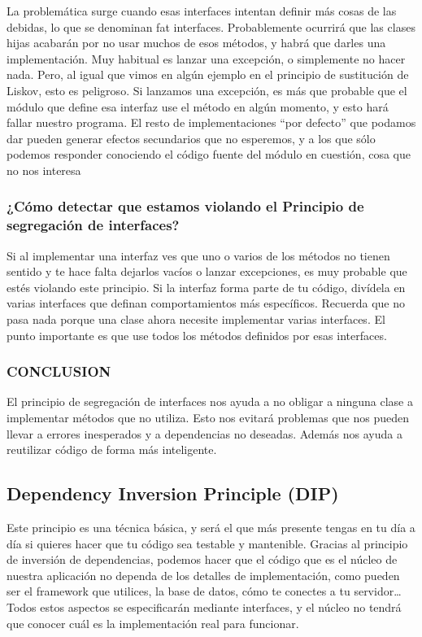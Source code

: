 \documentclass[12pt,letterpaper]{article}
\begin{document}
La problemática surge cuando esas interfaces intentan definir más cosas de las
debidas, lo que se denominan fat interfaces. Probablemente ocurrirá que las clases
hijas acabarán por no usar muchos de esos métodos, y habrá que darles una
implementación. Muy habitual es lanzar una excepción, o simplemente no hacer
nada.
Pero, al igual que vimos en algún ejemplo en el principio de sustitución de Liskov,
esto es peligroso. Si lanzamos una excepción, es más que probable que el módulo
que define esa interfaz use el método en algún momento, y esto hará fallar nuestro
programa. El resto de implementaciones “por defecto” que podamos dar pueden
generar efectos secundarios que no esperemos, y a los que sólo podemos responder
conociendo el código fuente del módulo en cuestión, cosa que no nos interesa

\subsubsection{¿Cómo detectar que estamos violando el
Principio de segregación de interfaces?}

Si al implementar una interfaz ves que
uno o varios de los métodos no tienen sentido y te hace falta dejarlos vacíos o
lanzar excepciones, es muy probable que estés violando este principio. Si la interfaz
forma parte de tu código, divídela en varias interfaces que definan comportamientos
más específicos.
Recuerda que no pasa nada porque una clase ahora necesite implementar varias
interfaces. El punto importante es que use todos los métodos definidos por esas
interfaces.

\subsubsection{CONCLUSION}

El principio de segregación de interfaces nos ayuda a no obligar a ninguna clase a
implementar métodos que no utiliza. Esto nos evitará problemas que nos pueden
llevar a errores inesperados y a dependencias no deseadas. Además nos ayuda a
reutilizar código de forma más inteligente.

\subsection{ Dependency Inversion Principle (DIP)}



Este principio es una técnica básica, y será el que más presente tengas en tu día a
día si quieres hacer que tu código sea testable y mantenible. Gracias al principio
de inversión de dependencias, podemos hacer que el código que es el núcleo de
nuestra aplicación no dependa de los detalles de implementación, como pueden ser el
framework que utilices, la base de datos, cómo te conectes a tu servidor… Todos estos
aspectos se especificarán mediante interfaces, y el núcleo no tendrá que conocer cuál
es la implementación real para funcionar.
\end{document}
